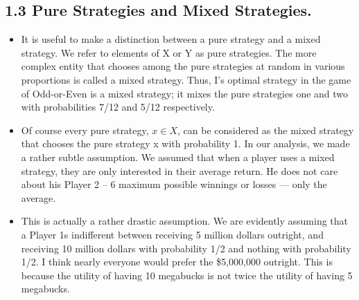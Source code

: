 \documentclass[]{report}
\begin{document}
\subsection{1.3 Pure Strategies and Mixed Strategies.} 
\begin{itemize}
\item It is useful to make a distinction
between a pure strategy and a mixed strategy. We refer to elements of X or Y as pure
strategies. The more complex entity that chooses among the pure strategies at random in
various proportions is called a mixed strategy. Thus, I’s optimal strategy in the game of
Odd-or-Even is a mixed strategy; it mixes the pure strategies one and two with probabilities
7/12 and 5/12 respectively. 
\item Of course every pure strategy, $x \in X$, can be considered as
the mixed strategy that chooses the pure strategy x with probability 1.
In our analysis, we made a rather subtle assumption. We assumed that when a player
uses a mixed strategy, they are only interested in their average return. He does not care about his
Player 2 – 6
maximum possible winnings or losses — only the average. \item This is actually a rather drastic
assumption. We are evidently assuming that a Player 1s indifferent between receiving 5
million dollars outright, and receiving 10 million dollars with probability 1/2 and nothing
with probability 1/2. I think nearly everyone would prefer the \$5,000,000 outright. This is
because the utility of having 10 megabucks is not twice the utility of having 5 megabucks.
\end{itemize}
\end{document}
